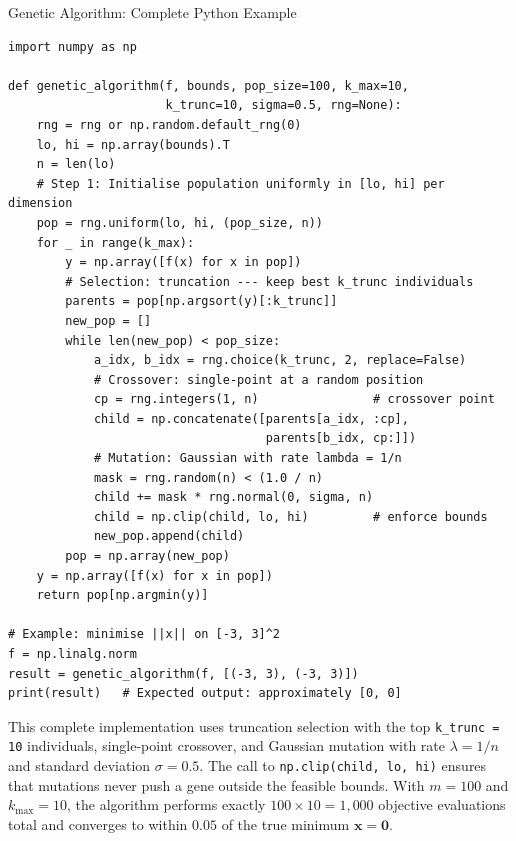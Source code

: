 \documentclass[aspectratio=169,10pt]{beamer}
\newcommand{\bx}{\mathbf{x}}
\begin{document}
\begin{frame}[fragile]{Genetic Algorithm: Complete Python Example}
\begin{lstlisting}[style=python, caption={Complete GA minimising $f(\bx)=\|\bx\|$ (Python / NumPy)}]
import numpy as np

def genetic_algorithm(f, bounds, pop_size=100, k_max=10,
                      k_trunc=10, sigma=0.5, rng=None):
    rng = rng or np.random.default_rng(0)
    lo, hi = np.array(bounds).T
    n = len(lo)
    # Step 1: Initialise population uniformly in [lo, hi] per dimension
    pop = rng.uniform(lo, hi, (pop_size, n))
    for _ in range(k_max):
        y = np.array([f(x) for x in pop])
        # Selection: truncation --- keep best k_trunc individuals
        parents = pop[np.argsort(y)[:k_trunc]]
        new_pop = []
        while len(new_pop) < pop_size:
            a_idx, b_idx = rng.choice(k_trunc, 2, replace=False)
            # Crossover: single-point at a random position
            cp = rng.integers(1, n)                # crossover point
            child = np.concatenate([parents[a_idx, :cp],
                                    parents[b_idx, cp:]])
            # Mutation: Gaussian with rate lambda = 1/n
            mask = rng.random(n) < (1.0 / n)
            child += mask * rng.normal(0, sigma, n)
            child = np.clip(child, lo, hi)         # enforce bounds
            new_pop.append(child)
        pop = np.array(new_pop)
    y = np.array([f(x) for x in pop])
    return pop[np.argmin(y)]

# Example: minimise ||x|| on [-3, 3]^2
f = np.linalg.norm
result = genetic_algorithm(f, [(-3, 3), (-3, 3)])
print(result)   # Expected output: approximately [0, 0]
\end{lstlisting}

  This complete implementation uses truncation selection with the top
  \texttt{k\_trunc = 10} individuals, single-point crossover, and
  Gaussian mutation with rate $\lambda = 1/n$ and standard deviation
  $\sigma = 0.5$.  The call to \texttt{np.clip(child, lo, hi)} ensures
  that mutations never push a gene outside the feasible bounds.  With
  $m = 100$ and $k_{\max} = 10$, the algorithm performs exactly
  $100 \times 10 = 1{,}000$ objective evaluations total and converges
  to within $0.05$ of the true minimum $\bx = \mathbf{0}$.

\end{frame}
\end{document}
